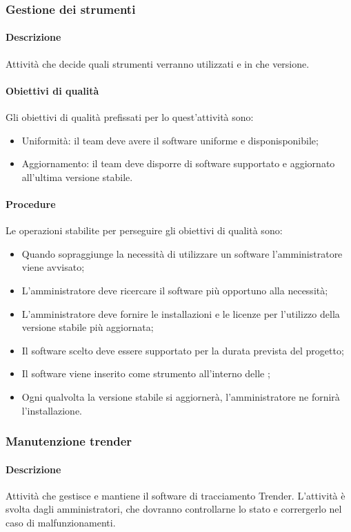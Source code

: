 \documentclass[../NormeDiProgetto_v3.0.0.tex]{subfiles}
\begin{document}
		\subsubsection{Gestione dei strumenti}
			\paragraph{Descrizione}
				Attività che decide quali strumenti verranno utilizzati e in che versione.
			\paragraph{Obiettivi di qualità}
				Gli obiettivi di qualità prefissati per lo quest'attività sono:
				\begin{itemize}
					\item Uniformità: il team deve avere il software uniforme e disponisponibile;
					\item Aggiornamento: il team deve disporre di software supportato e aggiornato all'ultima versione stabile.
				\end{itemize}
			\paragraph{Procedure}
				Le operazioni stabilite per perseguire gli obiettivi di qualità sono:
				\begin{itemize}
					\item Quando sopraggiunge la necessità di utilizzare un software l'amministratore viene avvisato;
					\item L'amministratore deve ricercare il software più opportuno alla necessità;
					\item L'amministratore deve fornire le installazioni e le licenze per l'utilizzo della versione stabile più aggiornata;
					\item Il software scelto deve essere supportato per la durata prevista del progetto;
					\item Il software viene inserito come strumento all'interno delle \normediprogetto;
					\item Ogni qualvolta la versione stabile si aggiornerà, l'amministratore ne fornirà l'installazione.
				\end{itemize}

		\subsubsection{Manutenzione trender}
			\paragraph{Descrizione}
				Attività che gestisce e mantiene il software di tracciamento Trender.
				L'attività è svolta dagli amministratori, che dovranno controllarne lo stato e corrergerlo nel caso di malfunzionamenti.			
\end{document}
